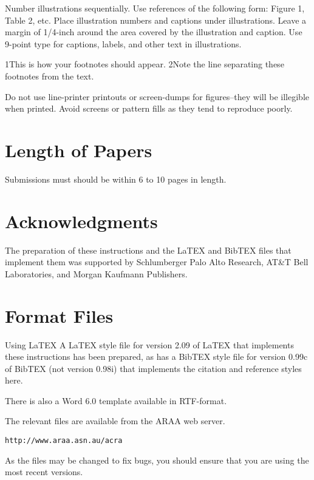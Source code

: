 \documentclass{article}
\begin{document}
Number illustrations sequentially. Use references of the following form: 
Figure 1, Table 2, etc. Place illustration numbers and captions under 
illustrations. Leave a margin of 1/4-inch around the area covered by the 
illustration and caption. Use 9-point type for captions, labels, and other 
text in illustrations.

1This is how your footnotes should appear. 2Note the line separating these footnotes from the text.

Do not use line-printer printouts or screen-dumps for figures--they will be illegible when printed. Avoid screens or pattern fills as they tend to reproduce poorly.

\section{Length of Papers} 
Submissions must should be within 6 to 10 pages in length. 

\section*{Acknowledgments}
The preparation of these instructions and the LaTEX and BibTEX files that implement them was supported by Schlumberger Palo Alto Research, AT\&T Bell Laboratories, and Morgan Kaufmann Publishers.

\section*{Format Files}
Using LaTEX A LaTEX style file for version 2.09 of LaTEX that implements these instructions has been prepared, as has a BibTEX style file for version 0.99c of BibTEX (not version 0.98i) that implements the citation and reference styles here.

There is also a Word 6.0 template available in RTF-format.

The relevant files are available from the ARAA web server.

\begin{center}
\begin{verbatim}
http://www.araa.asn.au/acra
\end{verbatim}
\end{center}

As the files may be changed to fix bugs, you should ensure that you are using the most recent versions.
\end{document}
